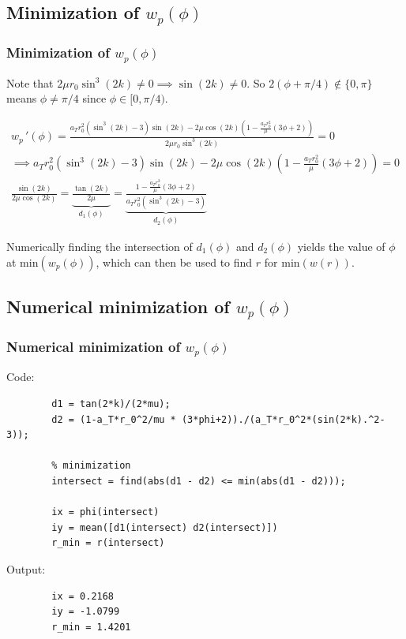 \documentclass{beamer}
\newcommand{\sectit}[1]{
    \section{\texorpdfstring{#1}{}}
    \frametitle{\texorpdfstring{#1}{}}
}
\begin{document}
\begin{frame}
    \sectit{Minimization of $w_p(\phi)$}

    Note that $2\mu r_0\sin^3(2k)\neq 0\implies \sin(2k)\neq 0$. So $2(\phi+\pi/4)\not\in \{0,\pi\}$ means $\phi\neq \pi/4$ since $\phi\in [0,\pi/4)$.

    {\scriptsize\begin{gather}
        w_p\,'(\phi)=\frac{a_Tr_0^2\left(\sin^3(2k)-3\right)\sin(2k)-2\mu\cos(2k)\left(1-\frac{a_Tr_0^2}{\mu}(3\phi+2)\right)}{2\mu r_0\sin^3(2k)}=0\\
        \implies a_Tr_0^2\left(\sin^3(2k)-3\right)\sin(2k)-2\mu\cos(2k)\left(1-\frac{a_Tr_0^2}{\mu}(3\phi+2)\right)=0\\
        \frac{\sin(2k)}{2\mu\cos(2k)}=\underbrace{\frac{\tan(2k)}{2\mu}}_{d_1(\phi)}=\underbrace{\frac{1-\frac{a_Tr_0^2}{\mu}(3\phi+2)}{a_Tr_0^2(\sin^3(2k)-3)}}_{d_2(\phi)}
    \end{gather}}

    Numerically finding the intersection of $d_1(\phi)$ and $d_2(\phi)$ yields the value of $\phi$ at $\text{min}(w_p(\phi))$, which can then be used to find $r$ for $\text{min}(w(r))$.

\end{frame}

\begin{frame}[fragile]
    \sectit{Numerical minimization of $w_p(\phi)$}

    Code:
    {\scriptsize\begin{verbatim}
        d1 = tan(2*k)/(2*mu);
        d2 = (1-a_T*r_0^2/mu * (3*phi+2))./(a_T*r_0^2*(sin(2*k).^2-3));

        % minimization
        intersect = find(abs(d1 - d2) <= min(abs(d1 - d2)));

        ix = phi(intersect)
        iy = mean([d1(intersect) d2(intersect)])
        r_min = r(intersect)
    \end{verbatim}}
    Output:

    \begin{verbatim}
        ix = 0.2168
        iy = -1.0799
        r_min = 1.4201
    \end{verbatim}

\end{frame}
\end{document}
